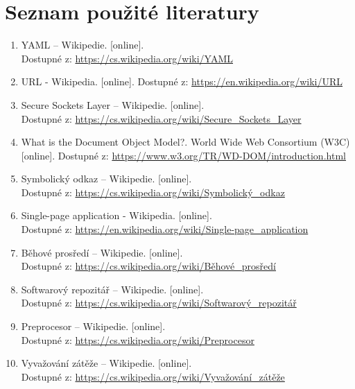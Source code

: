 \documentclass[12pt,a4paper]{report}
\begin{document}
  \chapter{Seznam použité literatury}
  \begin{enumerate}
  
    \item \noindent YAML – Wikipedie. [online]. \\ Dostupné z: \url{https://cs.wikipedia.org/wiki/YAML}
    
    \item \noindent URL - Wikipedia. [online]. Dostupné z: \url{https://en.wikipedia.org/wiki/URL}
    
    \item \noindent Secure Sockets Layer – Wikipedie. [online]. \\ Dostupné z: \url{https://cs.wikipedia.org/wiki/Secure\_Sockets\_Layer}
    
    \item \noindent What is the Document Object Model?. World Wide Web Consortium (W3C) [online]. Dostupné z: \url{https://www.w3.org/TR/WD-DOM/introduction.html}
    
    \item \noindent Symbolický odkaz – Wikipedie. [online].\\ Dostupné z: \url{https://cs.wikipedia.org/wiki/Symbolický\_odkaz}

    \item \noindent Single-page application - Wikipedia. [online]. \\ Dostupné z: \url{https://en.wikipedia.org/wiki/Single-page\_application}

    \item \noindent  Běhové prosředí – Wikipedie. [online].\\ Dostupné z: \url{https://cs.wikipedia.org/wiki/Běhové\_prosředí}
    
    \item \noindent Softwarový repozitář – Wikipedie. [online]. \\ Dostupné z: \url{https://cs.wikipedia.org/wiki/Softwarový\_repozitář}
  
    \item \noindent Preprocesor – Wikipedie. [online]. \\ Dostupné z: \url{https://cs.wikipedia.org/wiki/Preprocesor}

    \item \noindent  Vyvažování zátěže – Wikipedie. [online]. \\ Dostupné z: \url{https://cs.wikipedia.org/wiki/Vyvažování\_zátěže}
  

\end{enumerate}
\end{document}
